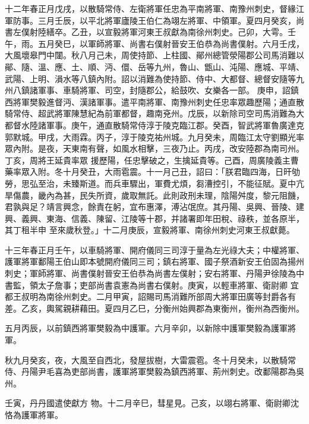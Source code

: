 \begin{pinyinscope}
 十二年春正月戊戌，以散騎常侍、左衛將軍任忠為平南將軍、南豫州刺史，督緣江軍防事。三月壬辰，以平北將軍廬陵王伯仁為翊左將軍、中領軍。夏四月癸亥，尚
 書左僕射陸繕卒。乙丑，以宣毅將軍河東王叔獻為南徐州刺史。己卯，大雩。壬午，雨。五月癸巳，以軍師將軍、尚書右僕射晉安王伯恭為尚書僕射。六月壬戌，大風壞皋門中闥。秋八月己未，周使持節、上柱國、鄖州總管滎陽郡公司馬消難以鄖、隨、溫、應、土、順、沔、儇、岳等九州，魯山、甑山、沌陽、應城、平靖、武陽、上明、溳水等八鎮內附。詔以消難為使持節、侍中、大都督、總督安隨等九州八鎮諸軍事、車騎將軍、司空，封隨郡公，給鼓吹、女樂各一部。
 庚申，詔鎮西將軍樊毅進督沔、漢諸軍事。遣平南將軍、南豫州刺史任忠率眾趣歷陽；通直散騎常侍、超武將軍陳慧紀為前軍都督，趣南兗州。戊辰，以新除司空司馬消難為大都督水陸諸軍事。庚午，通直散騎常侍淳于陵克臨江郡。癸酉，智武將軍魯廣達克郭默城。甲戌，大雨霖。丙子，淳于陵克祐州城。九月癸未，周臨江太守劉顯光率眾內附。是夜，天東南有聲，如風水相擊，三夜乃止。丙戌，改安陸郡為南司州。丁亥，周將王延貴率眾
 援歷陽，任忠擊破之，生擒延貴等。己酉，周廣陵義主曹藥率眾入附。冬十月癸丑，大雨雹震。十一月己丑，詔曰：「朕君臨四海，日旰劬勞，思弘至治，未臻斯道。而兵車驟出，軍費尤煩，芻漕控引，不能征賦。夏中亢旱傷農，畿內為甚，民失所資，歲取無託。此則政刑未理，陰陽舛度，黎元阻饑，君孰與足？靖言興念，餘責在躬，宜布惠澤，溥沾氓庶。其丹陽、吳興、晉陵、建興、義興、東海、信義、陳留、江陵等十郡，并諸署即年田稅、祿秩，並各原半，其丁租半申
 至來歲秋登。」十二月庚辰，宣毅將軍、南徐州刺史河東王叔獻薨。



 十三年春正月壬午，以車騎將軍、開府儀同三司淳于量為左光祿大夫；中權將軍、護軍將軍鄱陽王伯山即本號開府儀同三司；鎮右將軍、國子祭酒新安王伯固為揚州刺史；軍師將軍、尚書僕射晉安王伯恭為尚書左僕射；安右將軍、丹陽尹徐陵為中書監，領太子詹事；吏部尚書袁憲為尚書右僕射。庚寅，以輕車將軍、衛尉卿
 宜都王叔明為南徐州刺史。二月甲寅，詔賜司馬消難所部周大將軍田廣等封爵各有差。乙亥，輿駕親耕藉田。夏四月乙巳，分衡州始興郡為東衡州，衡州為西衡州。



 五月丙辰，以前鎮西將軍樊毅為中護軍。六月辛卯，以新除中護軍樊毅為護軍將軍。



 秋九月癸亥，夜，大風至自西北，發屋拔樹，大雷震雹。冬十月癸未，以散騎常侍、丹陽尹毛喜為吏部尚書，護軍將軍樊毅為鎮西將軍、荊州刺史。改鄱陽郡為吳州。



 壬寅，丹丹國遣使獻方
 物。十二月辛巳，彗星見。己亥，以翊右將軍、衛尉卿沈恪為護軍將軍。




\end{pinyinscope}
